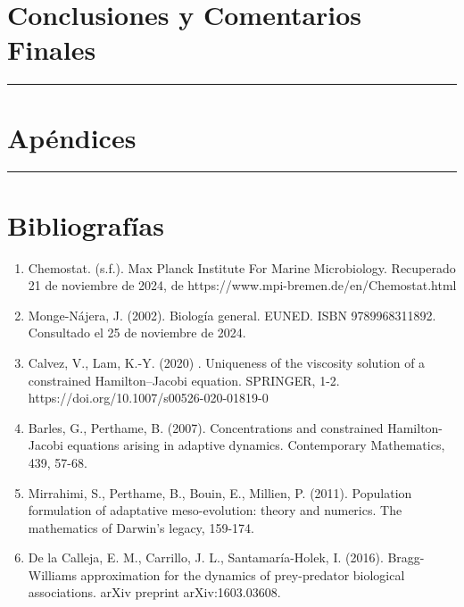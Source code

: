 \documentclass[letterpaper]{article}
\begin{document}
    \section{Conclusiones y Comentarios Finales}

    \vspace{0.2cm}
        \rule{150mm}{0.5mm} %
    \vspace{0.2cm}

    \section{Apéndices}

    \vspace{0.2cm}
        \rule{150mm}{0.5mm} %
    \vspace{0.2cm}

    \section{Bibliografías}

    \begin{enumerate}
        \item {

            \normalsize{Chemostat. (s.f.). Max Planck Institute For Marine Microbiology. Recuperado 21 de noviembre de 2024, de https://www.mpi-bremen.de/en/Chemostat.html}

        }

        \item {

            \normalsize{Monge-Nájera, J. (2002). Biología general. EUNED. ISBN 9789968311892. Consultado el 25 de noviembre de 2024.}
        
        }

        \item{
            \normalsize{Calvez, V., Lam, K.-Y. (2020) . Uniqueness of the viscosity solution of a constrained Hamilton–Jacobi equation. SPRINGER, 1-2. https://doi.org/10.1007/s00526-020-01819-0} 
        }

        \item {
            \normalsize{Barles, G., Perthame, B. (2007). Concentrations and constrained Hamilton-Jacobi equations arising in adaptive dynamics. Contemporary Mathematics, 439, 57-68.}
        }

        \item{
            \normalsize{Mirrahimi, S., Perthame, B., Bouin, E., Millien, P. (2011). Population formulation of adaptative meso-evolution: theory and numerics. The mathematics of Darwin’s legacy, 159-174.}
        }

        \item{
            \normalsize{De la Calleja, E. M., Carrillo, J. L., Santamaría-Holek, I. (2016). Bragg-Williams approximation for the dynamics of prey-predator biological associations. arXiv preprint arXiv:1603.03608.}
        }
    \end{enumerate}
\end{document}
